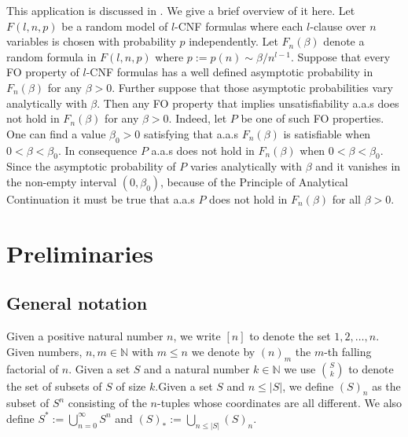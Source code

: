 \documentclass[12pt,notitlepage,a4paper]{article}
\theoremstyle{definition}
\newcommand{\N}{\mathbb{N}}
\begin{document}
This application is discussed in . We give a brief overview
of it here. Let $F(l,n,p)$ be a random model of $l$-CNF 
formulas where each $l$-clause over $n$ variables is chosen with probability
$p$ independently. Let $F_n(\beta)$ denote a random formula in
$F(l,n,p)$ where $p:=p(n)\sim \beta/n^{l-1}$. 
Suppose that 
every FO property of $l$-CNF formulas 
has a well defined asymptotic probability in $F_n(\beta)$
for any $\beta>0$.
Further suppose that those asymptotic probabilities vary analytically
with $\beta$. Then any FO property that implies unsatisfiability
a.a.s does not hold in $F_n(\beta)$ for any
$\beta>0$. Indeed, let $P$ be one of such FO properties. One can find a
value $\beta_0>0$ satisfying that 
a.a.s $F_n(\beta)$ is satisfiable when $0<\beta<\beta_0$.
In consequence $P$ a.a.s does not hold
in $F_n(\beta)$ when $0<\beta<\beta_0$.
Since the asymptotic probability of $P$ varies analytically
with $\beta$ and it vanishes in the non-empty interval $(0,\beta_0)$,
because of the Principle of Analytical Continuation
it must be true that a.a.s $P$ does not hold in $F_n(\beta)$ for all
$\beta>0$.




\section{Preliminaries}

\subsection{General notation}\label{subsect:notation}

Given a positive natural number $n$, we write
$[n]$ to denote the set ${1,2,\dots,n}$.
Given numbers, $n,m\in \N$ with $m\leq n$ we denote by
$(n)_m$ the $m$-th falling factorial of $n$. 
Given a set $S$ and a natural number $k\in \N$
we use $\binom{S}{k}$ to denote the set of 
subsets of $S$ of size $k$.Given a set
$S$ and $n\leq |S|$, we define
$(S)_n$ as the subset of $S^n$ consisting of the $n$-tuples
whose coordinates are all different. 
We also define $S^*:=\bigcup_{n=0}^\infty S^n$ and
$(S)_*:=\bigcup_{n\leq |S|} (S)_n$. \par
\end{document}
